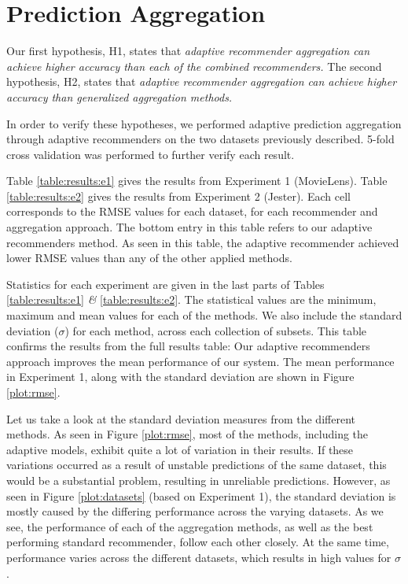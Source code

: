\section{Prediction Aggregation}





Our first hypothesis, H1, states that
{
  \itshape
  adaptive recommender aggregation can achieve higher accuracy
  than each of the combined recommenders.
}
The second hypothesis, H2, states that
{
  \itshape
  adaptive recommender aggregation can achieve higher accuracy than generalized aggregation methods.
}

In order to verify these hypotheses, we performed adaptive prediction aggregation
through adaptive recommenders on the two datasets previously described.
5-fold cross validation was performed to further verify each result.

Table \ref{table:results:e1} gives the results from Experiment 1 (MovieLens).
Table \ref{table:results:e2} gives the results from Experiment 2 (Jester).
Each cell corresponds to the RMSE values for each dataset,
for each recommender and aggregation approach.
The bottom entry in this table refers to our adaptive recommenders method.
As seen in this table, the adaptive recommender achieved
lower RMSE values than any of the other applied methods.

Statistics for each experiment are given in the last
parts of Tables \ref{table:results:e1} \emph{\&} \ref{table:results:e2}. 
The statistical values are the minimum, maximum and mean values
for each of the methods. We also include
the standard deviation ($\sigma$) for each method,
across each collection of subsets.
This table confirms the results from the full results table:
Our adaptive recommenders approach improves the mean performance
of our system.
The mean performance in Experiment 1, along with the standard deviation
are shown in Figure \ref{plot:rmse}.


%



Let us take a look at the standard deviation measures from the different methods.
As seen in Figure \ref{plot:rmse}, 
most of the methods, including the adaptive models,
exhibit quite a lot of variation in their results.
If these variations occurred as a result of unstable
predictions of the same dataset, this would be a substantial problem,
resulting in unreliable predictions.
However, as seen in Figure \ref{plot:datasets}
(based on Experiment 1),
the standard deviation is mostly caused by the differing
performance across the varying datasets.
As we see, the performance of each of the aggregation methods,
as well as the best performing standard recommender,
follow each other closely. At the same time,
performance varies across the different datasets,
which results in high values for $\sigma$.

